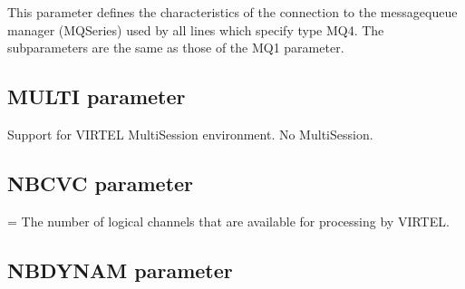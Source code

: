 \documentclass[letterpaper,10pt,english]{sphinxmanual}
\begin{document}
\sphinxAtStartPar
This parameter defines the characteristics of the connection to the message\sphinxhyphen{}queue manager (MQSeries) used by all lines which specify type MQ4. The subparameters are the same as those of the MQ1 parameter.

\ignorespaces 

\subsection{MULTI parameter}
\label{\detokenize{Installation_Guide:multi-parameter}}\label{\detokenize{Installation_Guide:index-93}}
\begin{sphinxVerbatim}[commandchars=\\\{\}]
 
\end{sphinxVerbatim}

\sphinxAtStartPar
{} \sphinxhyphen{} Support for VIRTEL Multi\sphinxhyphen{}Session environment.
 \sphinxhyphen{} No Multi\sphinxhyphen{}Session.

\ignorespaces 

\subsection{NBCVC parameter}
\label{\detokenize{Installation_Guide:nbcvc-parameter}}\label{\detokenize{Installation_Guide:index-94}}
\begin{sphinxVerbatim}[commandchars=\\\{\}]
 
\end{sphinxVerbatim}

\sphinxAtStartPar
{} = The number of logical channels that are available for processing by VIRTEL.

\ignorespaces 

\subsection{NBDYNAM parameter}
\label{\detokenize{Installation_Guide:nbdynam-parameter}}\label{\detokenize{Installation_Guide:index-95}}
\begin{sphinxVerbatim}[commandchars=\\\{\}]
 
\end{sphinxVerbatim}
\end{document}
